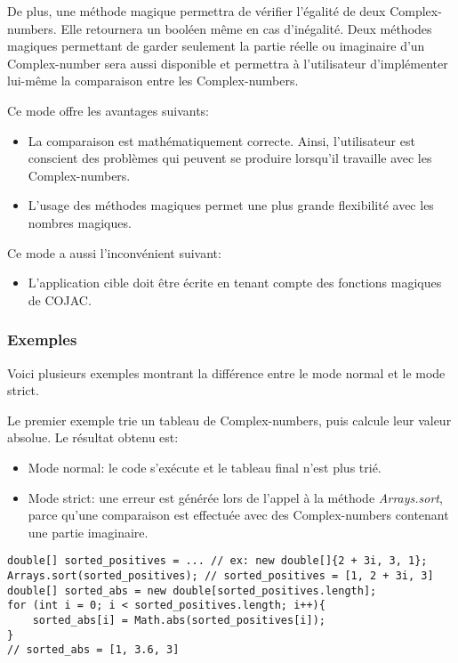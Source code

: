 De plus, une méthode magique permettra de vérifier l'égalité de deux \glspl{Complex-number}. Elle retournera un booléen même en cas d'inégalité. Deux méthodes magiques permettant de garder seulement la partie réelle ou imaginaire d'un \gls{Complex-number} sera aussi disponible et permettra à l'utilisateur d'implémenter lui-même la comparaison entre les \glspl{Complex-number}.

Ce mode offre les avantages suivants:

\begin{itemize}
    \item La comparaison est mathématiquement correcte. Ainsi, l'utilisateur est conscient des problèmes qui peuvent se produire lorsqu'il travaille avec les \glspl{Complex-number}.
    \item L'usage des méthodes magiques permet une plus grande flexibilité avec les nombres magiques.
\end{itemize}

Ce mode a aussi l'inconvénient suivant:

\begin{itemize}
    \item L'application cible doit être écrite en tenant compte des fonctions magiques de \gls{COJAC}.
\end{itemize}

\subsubsection{Exemples}

Voici plusieurs exemples montrant la différence entre le mode normal et le mode strict.

Le premier exemple trie un tableau de \glspl{Complex-number}, puis calcule leur valeur absolue. Le résultat obtenu est:

\begin{itemize}
    \item Mode normal: le code s'exécute et le tableau final n'est plus trié.
    \item Mode strict: une erreur est générée lors de l'appel à la méthode \textit{Arrays.sort}, parce qu'une comparaison est effectuée avec des \glspl{Complex-number} contenant une partie imaginaire.
\end{itemize}

\begin{verbatim}
double[] sorted_positives = ... // ex: new double[]{2 + 3i, 3, 1};
Arrays.sort(sorted_positives); // sorted_positives = [1, 2 + 3i, 3]
double[] sorted_abs = new double[sorted_positives.length];
for (int i = 0; i < sorted_positives.length; i++){
    sorted_abs[i] = Math.abs(sorted_positives[i]);
}
// sorted_abs = [1, 3.6, 3]
\end{verbatim}

